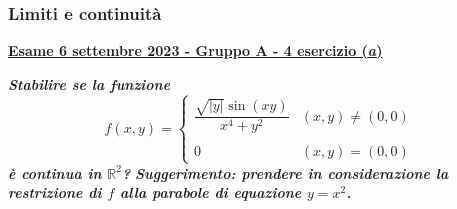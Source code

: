 \documentclass[a4paper]{article}
\newcommand{\definition}[1]{\textcolor{Red3}{\textbf{#1}}}
\newcommand{\example}[1]{\textcolor{Green4}{\textbf{#1}}}
\begin{document}
	\newpage

	\subsubsection{Limiti e continuità}

	\begin{flushleft}
		\label{exam: esame 06 settembre 2023 - Gruppo A - 4 esercizio (a)}
		\hypertarget{
			exam: esame 06 settembre 2023 - Gruppo A - 4 esercizio (a)
		}{
			\definition{\underline{Esame 6 settembre 2023 - Gruppo A - 4 esercizio (\emph{a})}}
		}
	\end{flushleft}
	\example{\emph{Stabilire se la funzione}
	\begin{equation*}
		f\left(x,y\right) = \begin{cases}
			\dfrac{\sqrt{\left|y\right|} \sin\left(xy\right)}{x^{4} + y^{2}} & \left(x,y\right) \ne \left(0,0\right) \\
			\\
			0 & \left(x,y\right) = \left(0,0\right)
		\end{cases}
	\end{equation*}
	\emph{è continua in $\mathbb{R}^{2}$?}}\newline
	\example{\emph{Suggerimento: prendere in considerazione la restrizione di $f$ alla parabole di equazione $y=x^{2}$.}}\newline
\end{document}

